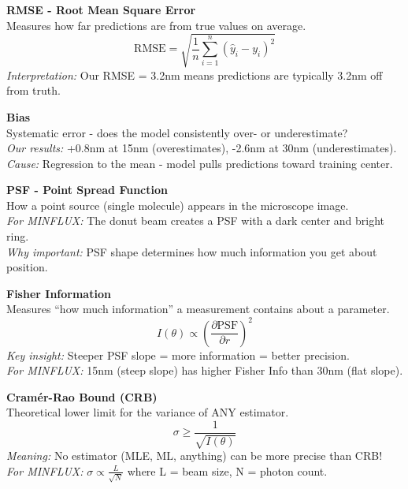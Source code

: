 \documentclass[a4paper,10pt]{article}
\begin{document}
\begin{mdframed}[style=glossar]
\textbf{RMSE - Root Mean Square Error}\\[3pt]
Measures how far predictions are from true values on average.\\
$$\text{RMSE} = \sqrt{\frac{1}{n}\sum_{i=1}^{n}(\hat{y}_i - y_i)^2}$$
\textit{Interpretation:} Our RMSE = 3.2nm means predictions are typically 3.2nm off from truth.
\end{mdframed}

\begin{mdframed}[style=glossar]
\textbf{Bias}\\[3pt]
Systematic error - does the model consistently over- or underestimate?\\
\textit{Our results:} +0.8nm at 15nm (overestimates), -2.6nm at 30nm (underestimates).\\
\textit{Cause:} Regression to the mean - model pulls predictions toward training center.
\end{mdframed}

\begin{mdframed}[style=glossar]
\textbf{PSF - Point Spread Function}\\[3pt]
How a point source (single molecule) appears in the microscope image.\\
\textit{For MINFLUX:} The donut beam creates a PSF with a dark center and bright ring.\\
\textit{Why important:} PSF shape determines how much information you get about position.
\end{mdframed}

\begin{mdframed}[style=glossar]
\textbf{Fisher Information}\\[3pt]
Measures ``how much information'' a measurement contains about a parameter.\\
$$I(\theta) \propto \left(\frac{\partial \text{PSF}}{\partial r}\right)^2$$
\textit{Key insight:} Steeper PSF slope = more information = better precision.\\
\textit{For MINFLUX:} 15nm (steep slope) has higher Fisher Info than 30nm (flat slope).
\end{mdframed}

\begin{mdframed}[style=glossar]
\textbf{Cram\'er-Rao Bound (CRB)}\\[3pt]
Theoretical lower limit for the variance of ANY estimator.\\
$$\sigma \geq \frac{1}{\sqrt{I(\theta)}}$$
\textit{Meaning:} No estimator (MLE, ML, anything) can be more precise than CRB!\\
\textit{For MINFLUX:} $\sigma \propto \frac{L}{\sqrt{N}}$ where L = beam size, N = photon count.
\end{mdframed}
\end{document}
